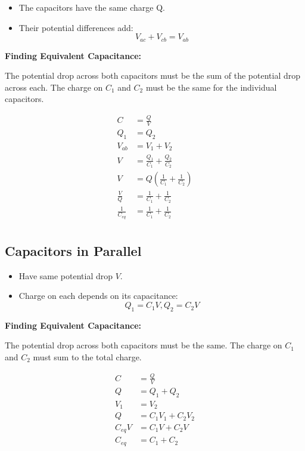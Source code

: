 \begin{itemize}
	\item The capacitors have the same charge Q.
	\item Their potential differences add:
		\[V_{ac}+ V_{c b} = V_{ab}\]
\end{itemize}

\textbf{Finding Equivalent Capacitance: }

The potential drop across both capacitors must be the sum of the potential drop across each.
The charge on $C_1$ and $C_2$ must be the same for the individual capacitors.

\begin{align*}
	C &= \frac{Q}{V} \\
	Q_1 &=  Q_2 \\
	V_{ab} &=   V_1 + V_2\\
	V &=  \frac{Q_1}{C_1}+ \frac{Q_2}{C_2} \\
	V &= Q\left(  \frac{1}{C_1} + \frac{1}{C_2} \right) \\
	\frac{V}{Q} &=  \frac{1}{C_1} + \frac{1}{C_2} \\
	\frac{1}{C_{eq}} &=  \frac{1}{C_1} + \frac{1}{C_2} \\
\end{align*}

\subsection{Capacitors in Parallel}%
\label{sub:capacitors_in_parallel}

\begin{itemize}
	\item Have same potential drop $V$.
	\item Charge on each depends on its capacitance:
		\[Q_1 = C_1V, Q_2 = C_2V\]
\end{itemize}

\textbf{Finding Equivalent Capacitance: }

The potential drop across both capacitors must be the same. The charge on $C_1$ and $C_2$ must
sum to the total charge.

\begin{align*}
	C &= \frac{Q}{V}\\
	Q &=Q_1 + Q_2  \\
	V_1 &= V_2 \\
	Q &= C_1V_1 + C_2V_2 \\
	C_{eq}V &= C_1V + C_2V \\
	C_{eq} &= C_1 + C_2 \\
\end{align*}

